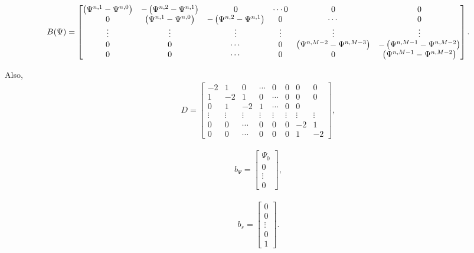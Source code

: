 \begin{align}
B(\Psi) = \begin{bmatrix}
    \left({\Psi^{n,1} - \Psi^{n, 0}}\right)   &  -\left({\Psi^{n,2} - \Psi^{n, 1}}\right)   & 0  &   \cdots   0   &   0   &   0 \\
    0                                &  \left({\Psi^{n,1} - \Psi^{n, 0}}\right)    & -\left({\Psi^{n,2} - \Psi^{n, 1}}\right)   & 0  & \cdots    &   0 \\
    \vdots    &  \vdots              &\vdots           &\vdots & \vdots & \vdots \\ 
    0         &  0                   &  \cdots        &  0              & \left({\Psi^{n,M-2} - \Psi^{n, M-3}}\right)   & -\left({\Psi^{n,M-1} - \Psi^{n, M-2}}\right) \\
0         &  0                   &  \cdots              &     0      &  0    &  \left({\Psi^{n,M-1} - \Psi^{n, M-2}}\right)
\end{bmatrix}.
\end{align}

Also, 
\begin{align}
D = \begin{bmatrix}
    -2   &  1   & 0  &   \cdots & 0   &   0   &   0   &   0 \\
    1    &  -2    & 1   & 0  & \cdots   & 0   &   0   &   0 \\
    0         & 1                    &  -2   & 1 & \cdots    &   0   &   0 \\
    \vdots    &  \vdots              &\vdots          &  \vdots  & \vdots   &\vdots & \vdots & \vdots \\ 
    0         &  0                   &  \cdots        &  0       &  0         &  0         & -2   & 1 \\
0         &  0                   &  \cdots        &  0           &  0         &     0      &  1    &  -2
\end{bmatrix},
\end{align}

\begin{align}
    b_\Psi = \begin{bmatrix}
        \Psi_0\\
        0\\
        \vdots\\
        0
    \end{bmatrix},
\end{align}

\begin{align}
    b_s = \begin{bmatrix}
        0\\
        0\\
        \vdots\\
        0\\
        1\end{bmatrix}.
\end{align}



